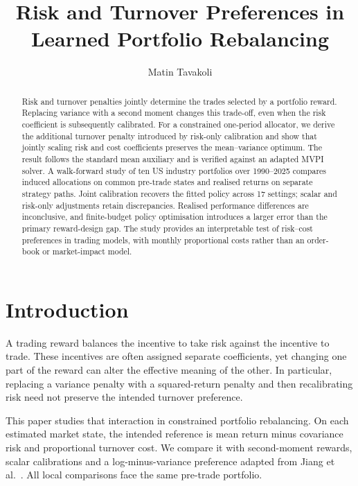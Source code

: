 \documentclass[sigconf,review]{acmart}
\title{Risk and Turnover Preferences in Learned Portfolio Rebalancing}
\author{Matin Tavakoli}
\begin{document}
\begin{abstract}
Risk and turnover penalties jointly determine the trades selected by a portfolio reward. Replacing variance with a second moment changes this trade-off, even when the risk coefficient is subsequently calibrated. For a constrained one-period allocator, we derive the additional turnover penalty introduced by risk-only calibration and show that jointly scaling risk and cost coefficients preserves the mean--variance optimum. The result follows the standard mean auxiliary and is verified against an adapted MVPI solver. A walk-forward study of ten US industry portfolios over 1990--2025 compares induced allocations on common pre-trade states and realised returns on separate strategy paths. Joint calibration recovers the fitted policy across 17 settings; scalar and risk-only adjustments retain discrepancies. Realised performance differences are inconclusive, and finite-budget policy optimisation introduces a larger error than the primary reward-design gap. The study provides an interpretable test of risk--cost preferences in trading models, with monthly proportional costs rather than an order-book or market-impact model.
\end{abstract}
\maketitle

\section{Introduction}
A trading reward balances the incentive to take risk against the incentive to trade. These incentives are often assigned separate coefficients, yet changing one part of the reward can alter the effective meaning of the other. In particular, replacing a variance penalty with a squared-return penalty and then recalibrating risk need not preserve the intended turnover preference.

This paper studies that interaction in constrained portfolio rebalancing. On each estimated market state, the intended reference is mean return minus covariance risk and proportional turnover cost. We compare it with second-moment rewards, scalar calibrations and a log-minus-variance preference adapted from Jiang et al.\ \cite{jiang2025}. All local comparisons face the same pre-trade portfolio.
\end{document}
